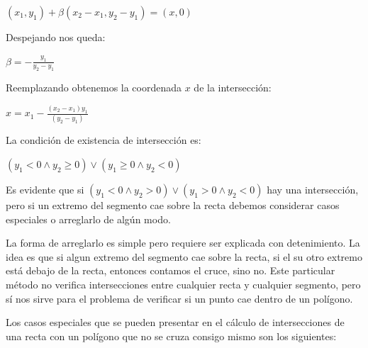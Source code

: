 \vspace{0.2cm}
$(x_1, y_1) + \beta(x_2 - x_1, y_2 - y_1) = (x, 0)$
\vspace{0.2cm}

Despejando nos queda:

\vspace{0.2cm}
$\beta = -\displaystyle\frac{y_1}{y_2 - y_1}$
\vspace{0.2cm}

Reemplazando obtenemos la coordenada $x$ de la intersección:

\vspace{0.2cm}
$x = x_1 -\displaystyle\frac{(x_2 - x_1)y_1}{(y_2 - y_1)}$
\vspace{0.2cm}

La condición de existencia de intersección es:

\vspace{0.2cm}
$( y_1 < 0 \wedge y_2 \ge 0 ) \vee ( y_1 \ge 0 \wedge y_2 < 0 )$
\vspace{0.2cm}

Es evidente que si $( y_1 < 0 \wedge y_2 > 0 ) \vee ( y_1 > 0 \wedge y_2 < 0 )$ hay una intersección, pero si un
extremo del segmento cae sobre la recta debemos considerar casos especiales o arreglarlo de algún modo.

La forma de arreglarlo es simple pero requiere ser explicada con detenimiento. La idea es que si algun
extremo del segmento cae sobre la recta, si el su otro extremo está debajo de la recta, entonces
contamos el cruce, sino no. Este particular método no verifica intersecciones entre cualquier recta y
cualquier segmento, pero sí nos sirve para el problema de verificar si un punto cae dentro de un polígono.

Los casos especiales que se pueden presentar en el cálculo de intersecciones de una recta con un polígono
que no se cruza consigo mismo son los siguientes:


